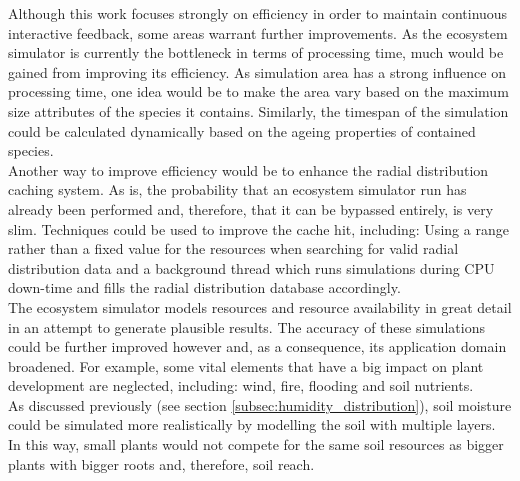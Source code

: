Although this work focuses strongly on efficiency in order to maintain continuous interactive feedback, some areas warrant further improvements. As the ecosystem simulator is currently the bottleneck in terms of processing time, much would be gained from improving its efficiency. As simulation area has a strong influence on processing time, one idea would be to make the area vary based on the maximum size attributes of the species it contains. Similarly, the timespan of the simulation could be calculated dynamically based on the ageing properties of contained species. \\
Another way to improve efficiency would be to enhance the radial distribution caching system. As is, the probability that an ecosystem simulator run has already been performed and, therefore, that it can be bypassed entirely, is very slim. Techniques could be used to improve the cache hit, including: Using a range rather than a fixed value for the resources when searching for valid radial distribution data and a background thread which runs simulations during CPU down-time and fills the radial distribution database accordingly.\\

The ecosystem simulator models resources and resource availability in great detail in an attempt to generate plausible results. The accuracy of these simulations could be further improved however and, as a consequence, its application domain broadened. For example, some vital elements that have a big impact on plant development are neglected, including: wind, fire, flooding and soil nutrients.\\
As discussed previously (see section \ref{subsec:humidity_distribution}), soil moisture could be simulated more realistically by modelling the soil with multiple layers. In this way, small plants would not compete for the same soil resources as bigger plants with bigger roots and, therefore, soil reach.\\ 

